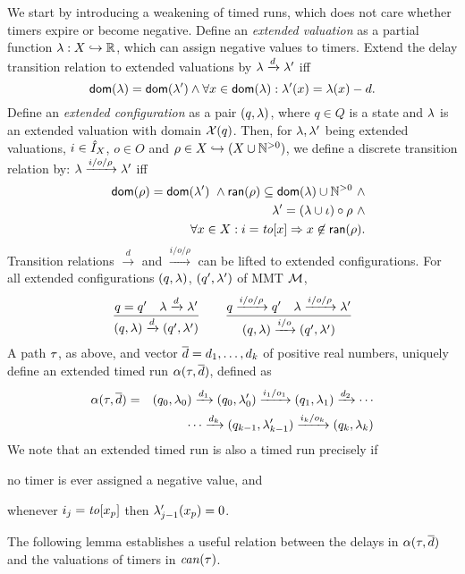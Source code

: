 We start by introducing a weakening of timed runs, which does not care
whether timers expire or become negative. Define an \emph{extended valuation}
as a partial function $\lambda : X \hookrightarrow {\mathbb R}$, which can assign
negative values to timers. 
Extend the delay transition relation to extended valuations by
$\lambda \xrightarrow{d} \lambda'$ iff
\[
{\textsf{dom}}(\lambda) = {\textsf{dom}}(\lambda') \wedge \forall x \in{\textsf{dom}}(\lambda) : \lambda'(x) = \lambda(x) - d .
\]
Define an \emph{extended configuration} as a pair $(q,\lambda)$, where $q \in Q$ is a state and $\lambda$ is an extended valuation with domain $\mathcal{X}(q)$.
Then, for $\lambda, \lambda'$ being extended valuations, $i \in \hat{I}_{X}$, $o \in O$ and $\rho \in X \hookrightarrow (X \cup {\mathbb N}^{>0})$,
we define a discrete transition relation by: $\lambda \xrightarrow{i/o/\rho}  \lambda'$ iff
\begin{eqnarray*}
&& {\textsf{dom}}(\rho) = {\textsf{dom}}(\lambda') ~ \wedge {\textsf{ran}}(\rho) \subseteq {\textsf{dom}}(\lambda) \cup {\mathbb N}^{>0} ~ \wedge\\
  &&\lambda' = (\lambda \cup \iota) \circ \rho ~ \wedge
  \\
  && \forall x \in X : i=\mathit{to}[x] \Rightarrow x \not\in {\textsf{ran}}(\rho).
\end{eqnarray*}
Transition relations $\xrightarrow{d}$ and $\xrightarrow{i/o/\rho}$ can be lifted to extended configurations.
For all extended configurations $(q, \lambda)$, $(q', \lambda')$ of MMT ${\mathcal M}$,
\[
\frac{q = q' \quad \lambda \xrightarrow{d} \lambda'}{(q,\lambda) \xrightarrow{d} (q',\lambda')}
\quad\quad
  \frac{q \xrightarrow{i/o/\rho} q' \quad \lambda \xrightarrow{i/o/\rho} \lambda'}{(q,\lambda) \xrightarrow{i/o} (q',\lambda')}
\]
A path $\tau$, as above, and vector $\overline{d} = d_1, \ldots, d_k$ of positive real numbers, uniquely define an extended timed run
$\alpha(\tau,\overline{d})$, defined as
  \begin{eqnarray*}
\alpha(\tau,\overline{d}) & = & (q_0,\lambda_0) \xrightarrow{d_1} (q_0,\lambda_0') \xrightarrow{i_1/o_1} (q_1,\lambda_1) \xrightarrow{d_2} 
\cdots
\\ && \qquad \cdots
\xrightarrow{d_k} (q_{k-1},\lambda_{k-1}') \xrightarrow{i_k/o_k} (q_k,\lambda_k)
\end{eqnarray*}
  We note that an extended timed run is also a timed run precisely if
  \begin{inparaenum}[(i)]
  \item no timer is ever assigned a negative value, and
  \item whenever $i_j = \mathit{to}[x_p]$ then $\lambda_{j-1}'(x_p) = 0$.
  \end{inparaenum}
  The following lemma establishes a useful relation between the delays in
  $\alpha(\tau,\overline{d})$
and the valuations of timers in $\mathit{can}({\tau})$.

